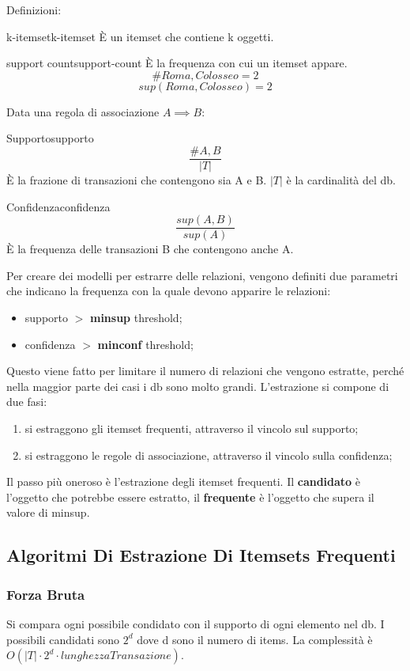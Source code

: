 \documentclass[12pt]{article}
\begin{document}
Definizioni:
\begin{definition}{k-itemset}{k-itemset}
    \`E un itemset che contiene k oggetti.
\end{definition}
\begin{definition}{support count}{support-count}
    \`E la frequenza con cui un itemset appare.
    \[ \#{Roma, Colosseo} = 2 \]
    \[ sup(Roma, Colosseo) = 2 \]
\end{definition}
Data una regola di associazione $A \implies B$:
\begin{definition}{Supporto}{supporto}
    \[ \frac{\#{A,B}}{|T|} \]
    \`E la frazione di transazioni che contengono sia A e B. $|T|$ \`e la cardinalit\`a del db.
\end{definition}
\begin{definition}{Confidenza}{confidenza}
    \[ \frac{sup(A,B)}{sup(A)} \]
    \`E la frequenza delle transazioni B che contengono anche A.
\end{definition}
Per creare dei modelli per estrarre  delle relazioni, vengono definiti due parametri che indicano la frequenza con la quale devono apparire le relazioni:
\begin{itemize}
    \item supporto $>$ \textbf{minsup} threshold;
    \item confidenza $>$ \textbf{minconf} threshold;
\end{itemize}
Questo viene fatto  per limitare il numero di relazioni che vengono estratte, perch\'e nella maggior parte dei casi i db sono molto grandi. L'estrazione si compone di due fasi:
\begin{enumerate}
    \item si estraggono gli itemset frequenti, attraverso il vincolo sul supporto;
    \item si estraggono le regole di associazione, attraverso il vincolo sulla confidenza;
\end{enumerate}
Il passo pi\`u oneroso \`e l'estrazione degli itemset frequenti. Il \textbf{candidato} \`e l'oggetto che potrebbe essere estratto, il \textbf{frequente} \`e l'oggetto che supera il valore di minsup.

\subsection{Algoritmi Di Estrazione Di Itemsets Frequenti}
\subsubsection{Forza Bruta}
Si compara ogni possibile condidato con il supporto di ogni elemento nel db. I possibili candidati sono $2^{d}$ dove d sono il numero di items. La complessit\`a \`e $O(|T| \cdot 2^{d} \cdot lunghezzaTransazione)$.
\end{document}
